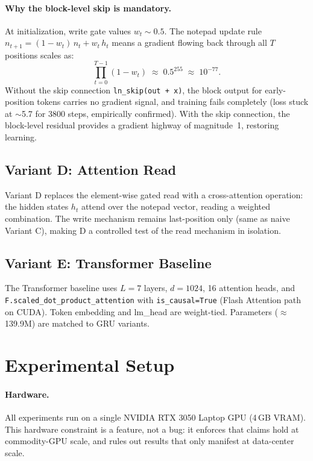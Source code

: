 \documentclass[11pt,a4paper]{article}
\begin{document}
\paragraph{Why the block-level skip is mandatory.}
At initialization, write gate values $w_t \sim 0.5$.  The notepad update
rule $n_{t+1} = (1-w_t)\,n_t + w_t\,h_t$ means a gradient flowing back
through all $T$ positions scales as:
\begin{equation}
  \prod_{t=0}^{T-1}(1 - w_t) \;\approx\; 0.5^{255} \;\approx\; 10^{-77}.
  \label{eq:vanish}
\end{equation}
Without the skip connection \texttt{ln\_skip(out + x)}, the block output
for early-position tokens carries no gradient signal, and training fails
completely (loss stuck at $\sim$5.7 for 3800 steps, empirically confirmed).
With the skip connection, the block-level residual provides a gradient
highway of magnitude~1, restoring learning.

\subsection{Variant D: Attention Read}
Variant D replaces the element-wise gated read with a cross-attention
operation: the hidden states $h_t$ attend over the notepad vector, reading
a weighted combination.  The write mechanism remains last-position only
(same as naive Variant C), making D a controlled test of the read
mechanism in isolation.

\subsection{Variant E: Transformer Baseline}
The Transformer baseline uses $L{=}7$ layers, $d{=}1024$, 16 attention
heads, and \texttt{F.scaled\_dot\_product\_attention} with
\texttt{is\_causal=True} (Flash Attention path on CUDA).  Token embedding
and lm\_head are weight-tied.  Parameters ($\approx$139.9M) are matched to
GRU variants.

\section{Experimental Setup}
\label{sec:setup}

\paragraph{Hardware.}
All experiments run on a single NVIDIA RTX 3050 Laptop GPU (4\,GB VRAM).
This hardware constraint is a feature, not a bug: it enforces that claims
hold at commodity-GPU scale, and rules out results that only manifest at
data-center scale.
\end{document}
